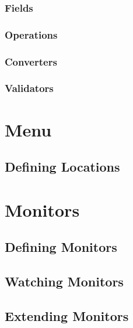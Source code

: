 \subsubsection{Fields}

\subsubsection{Operations}

\subsubsection{Converters}

\subsubsection{Validators}




\section{Menu}

\subsection{Defining Locations}





\section{Monitors}

\subsection{Defining Monitors}

\subsection{Watching Monitors}

\subsection{Extending Monitors}


